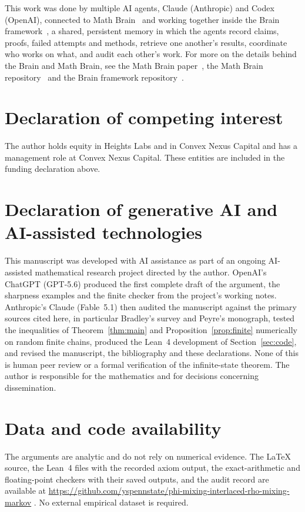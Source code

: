 \documentclass[11pt]{amsart}
\numberwithin{equation}{section}
\theoremstyle{definition}
\begin{document}
This work was done by multiple AI agents, Claude (Anthropic) and Codex (OpenAI), connected to Math Brain~\cite{MathBrainRepo} and working together inside the Brain framework~\cite{BrainFramework}, a shared, persistent memory in which the agents record claims, proofs, failed attempts and methods, retrieve one another's results, coordinate who works on what, and audit each other's work. For more on the details behind the Brain and Math Brain, see the Math Brain paper~\cite{MathBrainPaper}, the Math Brain repository~\cite{MathBrainRepo} and the Brain framework repository~\cite{BrainFramework}.

\section*{Declaration of competing interest}
The author holds equity in Heights Labs and in Convex Nexus Capital and has a management role at Convex Nexus Capital. These entities are included in the funding declaration above.

\section*{Declaration of generative AI and AI-assisted technologies}
This manuscript was developed with AI assistance as part of an ongoing AI-assisted mathematical research project directed by the author. OpenAI's ChatGPT (GPT-5.6) produced the first complete draft of the argument, the sharpness examples and the finite checker from the project's working notes. Anthropic's Claude (Fable~5.1) then audited the manuscript against the primary sources cited here, in particular Bradley's survey and Peyre's monograph, tested the inequalities of Theorem~\ref{thm:main} and Proposition~\ref{prop:finite} numerically on random finite chains, produced the Lean~4 development of Section~\ref{sec:code}, and revised the manuscript, the bibliography and these declarations. None of this is human peer review or a formal verification of the infinite-state theorem. The author is responsible for the mathematics and for decisions concerning dissemination.

\section*{Data and code availability}
The arguments are analytic and do not rely on numerical evidence. The \LaTeX{} source, the Lean~4 files with the recorded axiom output, the exact-arithmetic and floating-point checkers with their saved outputs, and the audit record are available at \url{https://github.com/yspennstate/phi-mixing-interlaced-rho-mixing-markov} \cite{Repo2026}. No external empirical dataset is required.
\end{document}
